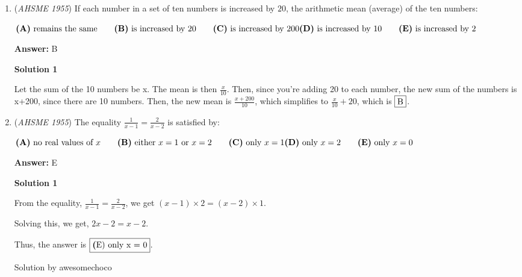 \begin{enumerate}
 



\textbf{Solution 2}

Using the formula $\frac{|(60h-11m)|}{2}$, and plugging in 12 for h and 25 for m, we get the angle between to be 222.5$^{\circ}$. Since the problem wants the smaller angle, we do $360-222.5 = 137.5 \Rightarrow 137^{\circ}30'\Rightarrow \fbox{B}$



	\item (\textit{AHSME 1955}) If each number in a set of ten numbers is increased by $20$, the arithmetic mean (average) of the ten numbers: 


 $\textbf{(A)}\ \text{remains the same}\qquad\textbf{(B)}\ \text{is increased by 20}\qquad\textbf{(C)}\ \text{is increased by 200}\\ \textbf{(D)}\ \text{is increased by 10}\qquad\textbf{(E)}\ \text{is increased by 2}$

 \textbf{Answer: }B



\textbf{Solution 1}

Let the sum of the 10 numbers be x. The mean is then $\frac{x}{10}$.  Then, since you're adding 20 to each number, the new sum of the numbers is x+200, since there are 10 numbers. Then, the new mean is $\frac{x+200}{10}$, which simplifies to $\frac{x}{10}+20$, which is $\fbox{B}$.

 


	\item (\textit{AHSME 1955}) The equality $\frac{1}{x-1}=\frac{2}{x-2}$ is satisfied by: 


 $\textbf{(A)}\ \text{no real values of }x\qquad\textbf{(B)}\ \text{either }x=1\text{ or }x=2\qquad\textbf{(C)}\ \text{only }x=1\\ \textbf{(D)}\ \text{only }x=2\qquad\textbf{(E)}\ \text{only }x=0$

 \textbf{Answer: }E



\textbf{Solution 1}

From the equality, $\frac{1}{x-1}=\frac{2}{x-2}$, we get  ${(x-1)}\times2={(x-2)}\times1$.

 Solving this, we get, ${2x-2}={x-2}$.

 Thus, the answer is $\fbox{{\textbf(E)} \text{only} x = 0}$.

 Solution by awesomechoco

 




\end{enumerate}
